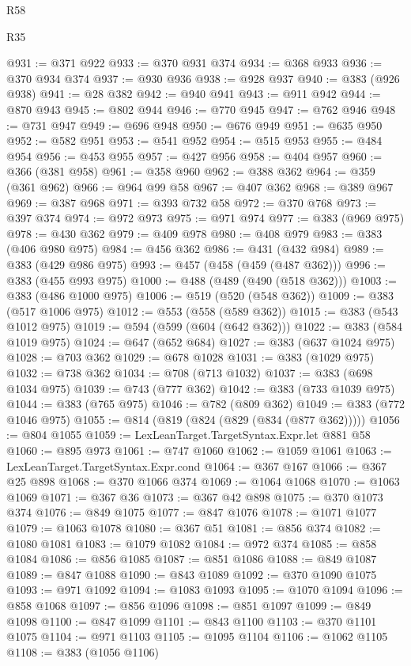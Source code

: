 \begin{lexlean}{R58}
\begin{lexlean}{R35}
\begin{coremodule}
{{{{{{{{{{{{{{{{{{{{{{{{{{{{{{{{{{{{{{{{{{{{{{{{{{{{@931 := @371 @922
@933 := @370 @931 @374
@934 := @368 @933
@936 := @370 @934 @374
@937 := @930 @936
@938 := @928 @937
@940 := @383 (@926 @938)
@941 := @28 @382
@942 := @940 @941
@943 := @911 @942
@944 := @870 @943
@945 := @802 @944
@946 := @770 @945
@947 := @762 @946
@948 := @731 @947
@949 := @696 @948
@950 := @676 @949
@951 := @635 @950
@952 := @582 @951
@953 := @541 @952
@954 := @515 @953
@955 := @484 @954
@956 := @453 @955
@957 := @427 @956
@958 := @404 @957
@960 := @366 (@381 @958)
@961 := @358 @960
@962 := @388 @362
@964 := @359 (@361 @962)
@966 := @964 @99 @58
@967 := @407 @362
@968 := @389 @967
@969 := @387 @968
@971 := @393 @732 @58
@972 := @370 @768
@973 := @397 @374
@974 := @972 @973
@975 := @971 @974
@977 := @383 (@969 @975)
@978 := @430 @362
@979 := @409 @978
@980 := @408 @979
@983 := @383 (@406 @980 @975)
@984 := @456 @362
@986 := @431 (@432 @984)
@989 := @383 (@429 @986 @975)
@993 := @457 (@458 (@459 (@487 @362)))
@996 := @383 (@455 @993 @975)
@1000 := @488 (@489 (@490 (@518 @362)))
@1003 := @383 (@486 @1000 @975)
@1006 := @519 (@520 (@548 @362))
@1009 := @383 (@517 @1006 @975)
@1012 := @553 (@558 (@589 @362))
@1015 := @383 (@543 @1012 @975)
@1019 := @594 (@599 (@604 (@642 @362)))
@1022 := @383 (@584 @1019 @975)
@1024 := @647 (@652 @684)
@1027 := @383 (@637 @1024 @975)
@1028 := @703 @362
@1029 := @678 @1028
@1031 := @383 (@1029 @975)
@1032 := @738 @362
@1034 := @708 (@713 @1032)
@1037 := @383 (@698 @1034 @975)
@1039 := @743 (@777 @362)
@1042 := @383 (@733 @1039 @975)
@1044 := @383 (@765 @975)
@1046 := @782 (@809 @362)
@1049 := @383 (@772 @1046 @975)
@1055 := @814 (@819 (@824 (@829 (@834 (@877 @362)))))
@1056 := @804 @1055
@1059 := LexLeanTarget.TargetSyntax.Expr.let @881 @58
@1060 := @895 @973
@1061 := @747 @1060
@1062 := @1059 @1061
@1063 := LexLeanTarget.TargetSyntax.Expr.cond
@1064 := @367 @167
@1066 := @367 @25 @898
@1068 := @370 @1066 @374
@1069 := @1064 @1068
@1070 := @1063 @1069
@1071 := @367 @36
@1073 := @367 @42 @898
@1075 := @370 @1073 @374
@1076 := @849 @1075
@1077 := @847 @1076
@1078 := @1071 @1077
@1079 := @1063 @1078
@1080 := @367 @51
@1081 := @856 @374
@1082 := @1080 @1081
@1083 := @1079 @1082
@1084 := @972 @374
@1085 := @858 @1084
@1086 := @856 @1085
@1087 := @851 @1086
@1088 := @849 @1087
@1089 := @847 @1088
@1090 := @843 @1089
@1092 := @370 @1090 @1075
@1093 := @971 @1092
@1094 := @1083 @1093
@1095 := @1070 @1094
@1096 := @858 @1068
@1097 := @856 @1096
@1098 := @851 @1097
@1099 := @849 @1098
@1100 := @847 @1099
@1101 := @843 @1100
@1103 := @370 @1101 @1075
@1104 := @971 @1103
@1105 := @1095 @1104
@1106 := @1062 @1105
@1108 := @383 (@1056 @1106)
}}}}}}}}}}}}}}}}}}}}}}}}}}}}}}}}}}}}}}}}}}}}}}}}}}}}
\end{coremodule}
\end{lexlean}
\end{lexlean}
